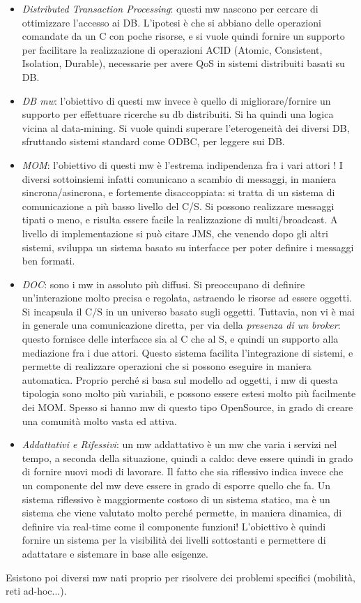 \begin{itemize}
 \item \textit{Distributed Transaction Processing}: questi mw nascono per cercare di ottimizzare l'accesso ai DB.
 L'ipotesi è che si abbiano delle operazioni comandate da un C con poche risorse, e si vuole quindi fornire un supporto
 per facilitare la realizzazione di operazioni ACID (Atomic, Consistent, Isolation, Durable), necessarie per avere
 QoS in sistemi distribuiti basati su DB.
 \item \textit{DB mw}: l'obiettivo di questi mw invece è quello di migliorare/fornire un supporto per effettuare
 ricerche su db distribuiti. Si ha quindi una logica vicina al data-mining. Si vuole quindi superare l'eterogeneità
 dei diversi DB, sfruttando sistemi standard come ODBC, per leggere sui DB.
 \item \textit{MOM}: l'obiettivo di questi mw è l'estrema indipendenza fra i vari attori ! I diversi sottoinsiemi
 infatti comunicano a scambio di messaggi, in maniera sincrona/asincrona, e fortemente disaccoppiata: si tratta di un
 sistema di comunicazione a più basso livello del C/S. Si possono realizzare messaggi tipati o meno, e risulta essere
 facile la realizzazione di multi/broadcast.
 A livello di implementazione si può citare JMS, che venendo dopo gli altri sistemi, sviluppa un sistema basato su
 interfacce per poter definire i messaggi ben formati.
 \item \textit{DOC}: sono i mw in assoluto più diffusi. Si preoccupano di definire un'interazione molto precisa e
 regolata, astraendo le risorse ad essere oggetti.
 Si incapsula il C/S in un universo basato sugli oggetti. Tuttavia, non vi è mai in generale una comunicazione diretta,
 per via della \textit{presenza di un broker}: questo fornisce delle interfacce sia al C che al S, e quindi un supporto
 alla mediazione fra i due attori. Questo sistema facilita l'integrazione di sistemi, e permette di realizzare
 operazioni che si possono eseguire in maniera automatica.
 Proprio perché si basa sul modello ad oggetti, i mw di questa tipologia sono molto più variabili, e possono essere
 estesi molto più facilmente dei MOM. Spesso si hanno mw di questo tipo OpenSource, in grado di creare una comunità
 molto vasta ed attiva.
 \item \textit{Addattativi e Rifessivi}: un mw addattativo è un mw che varia i servizi nel tempo, a seconda della
 situazione, quindi a caldo: deve essere quindi in grado di fornire nuovi modi di lavorare.
 Il fatto che sia riflessivo indica invece che un componente del mw deve essere in grado di esporre quello che fa. Un
 sistema riflessivo è maggiormente costoso di un sistema statico, ma è un sistema che viene valutato molto
 perché permette, in maniera dinamica, di definire via real-time come il componente funzioni!
 L'obiettivo è quindi fornire un sistema per la visibilità dei livelli sottostanti e permettere di adattatare e
 sistemare in base alle esigenze.
\end{itemize}
Esistono poi diversi mw nati proprio per risolvere dei problemi specifici (mobilità, reti ad-hoc...).
